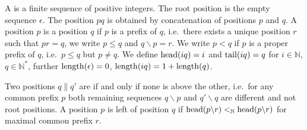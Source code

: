 
\begin{definition}\label{def:position}
	A  is a finite sequence of positive integers.
	The root position is the empty sequence \( \epsilon \).
	The position \( pq \) is obtained by concatenation of positions \( p \) and \( q \).
	A position \( p \) is  a position \( q \) if \( p \) is a prefix of \( q \),
	i.e.~there exists a unique position \( r \) such that \( pr = q \),
	we write \( p\leq q \) and \( q\backslash p = r \).
	We write \( p<q \) if \( p \) is a proper prefix of \( q \), i.e.~\( p\leq q \) but \( p\neq q \).
	We define
	\( \operatorname{head}(iq)=i \) and
	\( \operatorname{tail}(iq) = q \)
	for \( i\in\mathbb{N} \),
	\( q\in\mathbb{N}^* \),
	further
	\( \operatorname{length}(\epsilon)=0 \),
	\( \operatorname{length}(iq) = 1 + \operatorname{length}(q) \).

	Two positions \( q\parallel q' \) are  
	if and only if none is above the other,
	i.e.~for any common prefix \( p \) both remaining sequences
	\( q\backslash p \) and \( q'\backslash q \) are different and not root positions.
	A position \( p \) is left of position \( q \) if \( \operatorname{head}(p\backslash r) <_{\mathbb{N}} \operatorname{head}(p\backslash r) \)
	for maximal common prefix \( r \).

\end{definition}
